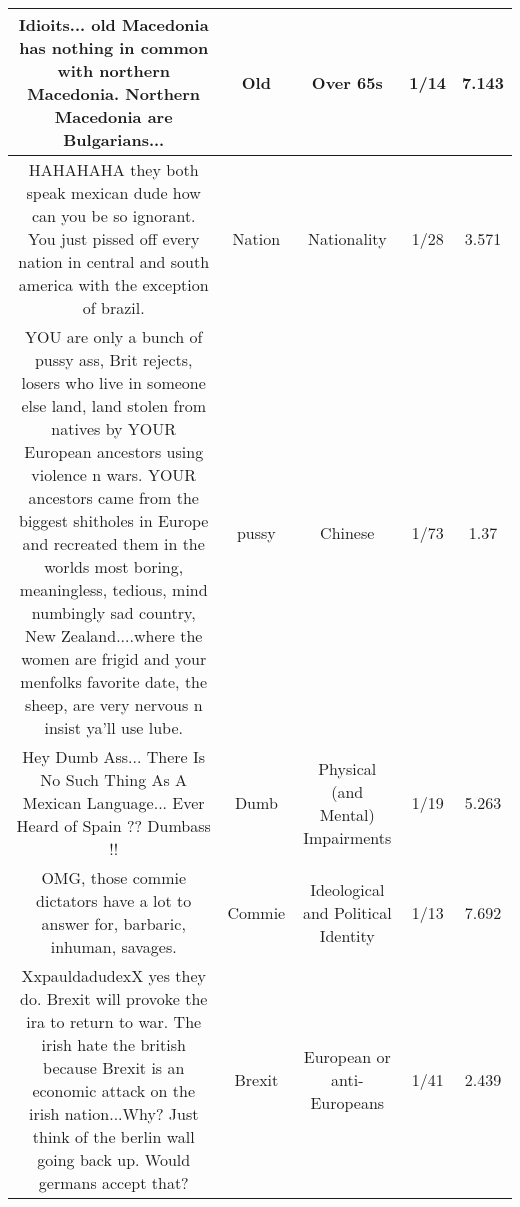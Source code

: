 \documentclass[11pt]{article}
\newlength\mylength
\begin{document}
\begin{center}
\begin{longtable}{|C{.40\mylength}|C{.30\mylength}|C{.15\mylength}|C{.15\mylength}|C{.15\mylength}|}
  Idioits... old Macedonia has nothing in common with northern Macedonia. Northern Macedonia are Bulgarians...  & Old & Over 65s & 1/14 & 7.143 \\  \hline
  HAHAHAHA they both speak  mexican  dude how can you be so ignorant. You just pissed off every nation in central and south america with the exception of brazil.  & Nation & Nationality & 1/28 & 3.571 \\  \hline
  YOU are only a bunch of pussy ass, Brit rejects, losers who live in someone else land, land stolen from natives by YOUR European ancestors using violence n wars. YOUR ancestors came from the biggest shitholes in Europe and recreated them in the worlds most boring, meaningless, tedious, mind numbingly sad country, New Zealand....where the women are frigid and your menfolks favorite date, the sheep, are very nervous n insist ya'll use lube.  & pussy & Chinese & 1/73 & 1.37 \\  \hline
  Hey Dumb Ass... There Is No Such Thing As A Mexican Language... Ever Heard of Spain ?? Dumbass !!  & Dumb & Physical (and Mental) Impairments & 1/19 & 5.263 \\  \hline
  OMG, those commie dictators have a lot to answer for, barbaric, inhuman, savages.  & Commie &  Ideological and Political Identity & 1/13 & 7.692 \\  \hline
   XxpauldadudexX yes they do. Brexit will provoke the ira to return to war. The irish hate the british because Brexit is an economic attack on the irish nation...Why? Just think of the berlin wall going back up. Would germans accept that?  & Brexit & European or anti-Europeans & 1/41 & 2.439 \\  \hline

\end{longtable}
\end{center}
\end{document}
